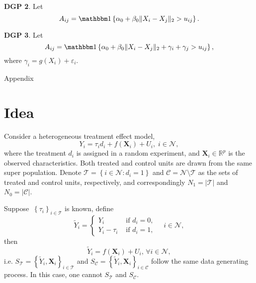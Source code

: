 \noindent \textbf{DGP 2}. Let 
\begin{equation}
    A_{ij} = \I  \left\{ \alpha_{0} + \beta _{0} \lVert X _{i} - X _{j}  \rVert_2 > u_{ij}  \right\}.
\end{equation}

\noindent \textbf{DGP 3}. Let 
\begin{equation}
    A_{ij} = \I  \left\{ \alpha_{0} + \beta _{0} \lVert X _{i} - X _{j}  \rVert_2 + \gamma _{i} + \gamma _{j} > u_{ij}  \right\}, 
\end{equation}
where \(\gamma _{i} = g \left( X_i \right) + \varepsilon _{i} \). 


\newpage



\newpage
\appendix

\begin{center}
{\huge Appendix}
\end{center}

\setcounter{table}{0} \renewcommand{\thetable}{A.\arabic{table}} %
\setcounter{section}{0} \renewcommand{\thesection}{A.\arabic{section}} %
\setcounter{figure}{0} \renewcommand{\thefigure}{A.\arabic{figure}}

\section{Idea}

Consider a heterogeneous treatment effect model,
\begin{equation}
    Y_{i}  = \tau _{i}  d_{i} + f\left( \bm{X} _i \right) + U_i,\;  i \in \mathcal{N},
\end{equation}
where the treatment \(d_i\) is assigned in a random experiment, and \(\bm{X} _{i} \in \mathbb{R}^{p} \) is the observed characteristics. Both treated and control units are drawn from the same super population.
Denote 
\(\mathcal{T} =\left\{ i \in \mathcal{N} : d _{i} = 1 \right\} \) and
\(\mathcal{C} = \mathcal{N} \setminus \mathcal{T} \) 
as the sets of treated and control units, respectively, and correspondingly \(N_{1} = \vert \mathcal{T}  \vert \) and \(N_{0} = \vert \mathcal{C}  \vert \).

Suppose \(\ \left\{ \tau _{i}  \right\} _{i \in \mathcal{T} }\)  is known, define
\begin{equation}
    \tilde{Y}_{i}  = \begin{cases}
        Y_{i}  & \text{ if }  d_{i} = 0, \\
        Y_i -\tau _{i} & \text{ if }  d _{i} = 1,
    \end{cases} \quad i \in \mathcal{N},
\end{equation}
then
\[
    \tilde{Y}_{i} = f\left( \bm{X} _{i}  \right) + U_i,\, \forall i\in \mathcal{N}, 
\]
i.e. \(S_{\mathcal{T} } = \left\{ \tilde{Y} _{i} , \bm{X} _{i}  \right\}_{i\in \mathcal{T} } \) and \(S_{\mathcal{\mathcal{C} } } = \left\{ \tilde{Y} _{i} , \bm{X} _{i}  \right\}_{i\in \mathcal{\mathcal{C} } } \) follow the same data generating process. In this case, one cannot \(S_{\mathcal{T} }\) and \(S_{\mathcal{C} }\). 

